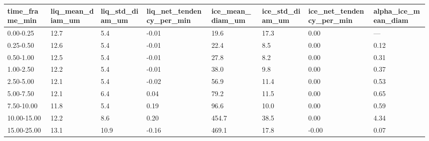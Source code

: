 \begin{tabular}{llllllll}
\toprule
time_frame_min & liq_mean_diam_um & liq_std_diam_um & liq_net_tendency_per_min & ice_mean_diam_um & ice_std_diam_um & ice_net_tendency_per_min & alpha_ice_mean_diam \\
\midrule
0.00-0.25 & 12.7 & 5.4 & -0.01 & 19.6 & 17.3 & 0.00 & — \\
0.25-0.50 & 12.6 & 5.4 & -0.01 & 22.4 & 8.5 & 0.00 & 0.12 \\
0.50-1.00 & 12.5 & 5.4 & -0.01 & 27.8 & 8.2 & 0.00 & 0.31 \\
1.00-2.50 & 12.2 & 5.4 & -0.01 & 38.0 & 9.8 & 0.00 & 0.37 \\
2.50-5.00 & 12.1 & 5.4 & -0.02 & 56.9 & 11.4 & 0.00 & 0.53 \\
5.00-7.50 & 12.1 & 6.4 & 0.04 & 79.2 & 11.5 & 0.00 & 0.65 \\
7.50-10.00 & 11.8 & 5.4 & 0.19 & 96.6 & 10.0 & 0.00 & 0.59 \\
10.00-15.00 & 12.2 & 8.6 & 0.20 & 454.7 & 38.5 & 0.00 & 4.34 \\
15.00-25.00 & 13.1 & 10.9 & -0.16 & 469.1 & 17.8 & -0.00 & 0.07 \\
\bottomrule
\end{tabular}
